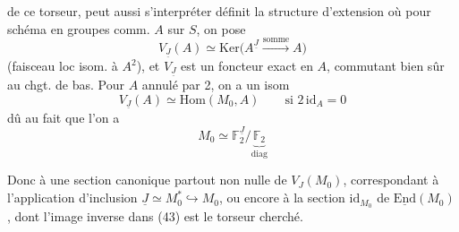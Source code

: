  de ce torseur,   peut aussi s'interpréter   définit la structure d'extension
où pour  schéma  en groupes comm. $A$ sur $S$, on pose
\[
V_{\underline J}(A)\simeq \mathrm{Ker}\big(A^{\underline J}\xrightarrow{\mathrm{somme}} A\big) \tag*{(44)}
\]
(faisceau loc isom. à $A^2$), et $V_{\underline J}$ est un foncteur exact en $A$, commutant bien sûr au chgt. de bas. Pour $A$ annulé par 2, on a un isom
\[
V_{\underline J}(A)\simeq\mathrm{Hom}(M_0,A)\qquad\text{si }2\,\mathrm{id}_A=0 \tag*{(45)}
\]
dû au fait que l'on a
\[
M_0\simeq\mathbb F_2^{\underline J}/\underbrace{\mathbb F_2}_{\mathrm{diag}} \tag*{(46)}
\]

Donc à une section  canonique partout non nulle de $V_J(M_0)$, correspondant à l'application d'inclusion $\underline J\simeq M_0^\ast\hookrightarrow M_0$, ou encore à la section  $\mathrm{id}_{M_0}$ de $\underline{\mathrm{End}}(M_0)$, dont l'image inverse dans (43) est le torseur cherché.
